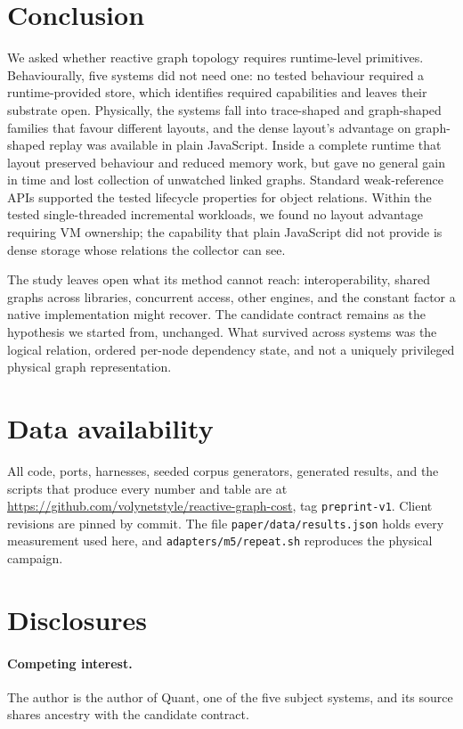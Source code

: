 \documentclass[11pt]{article}
\begin{document}
\section{Conclusion}

We asked whether reactive graph topology requires runtime-level primitives. Behaviourally, five systems did not need one: no tested behaviour required a runtime-provided store, which identifies required capabilities and leaves their substrate open. Physically, the systems fall into trace-shaped and graph-shaped families that favour different layouts, and the dense layout's advantage on graph-shaped replay was available in plain JavaScript. Inside a complete runtime that layout preserved behaviour and reduced memory work, but gave no general gain in time and lost collection of unwatched linked graphs. Standard weak-reference APIs supported the tested lifecycle properties for object relations. Within the tested single-threaded incremental workloads, we found no layout advantage requiring VM ownership; the capability that plain JavaScript did not provide is dense storage whose relations the collector can see.

The study leaves open what its method cannot reach: interoperability, shared graphs across libraries, concurrent access, other engines, and the constant factor a native implementation might recover. The candidate contract remains as the hypothesis we started from, unchanged. What survived across systems was the logical relation, ordered per-node dependency state, and not a uniquely privileged physical graph representation.

\section*{Data availability}

All code, ports, harnesses, seeded corpus generators, generated results, and the scripts that produce every number and table are at \url{https://github.com/volynetstyle/reactive-graph-cost}, tag \texttt{preprint-v1}. Client revisions are pinned by commit. The file \texttt{paper/data/results.json} holds every measurement used here, and \texttt{adapters/m5/repeat.sh} reproduces the physical campaign.

\section*{Disclosures}

\paragraph{Competing interest.} The author is the author of Quant, one of the five subject systems, and its source shares ancestry with the candidate contract.
\end{document}
